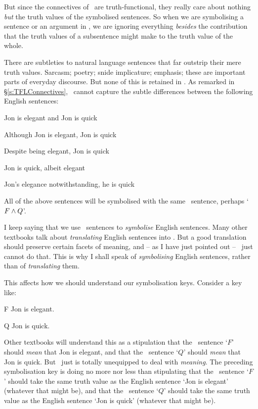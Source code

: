 But since the connectives of \TFL\ are truth-functional, they really care about nothing \emph{but} the truth values of the symbolised sentences. So when we are symbolising a sentence or an argument in \TFL, we  are ignoring everything \emph{besides} the contribution that the truth values of a subsentence might make to the truth value of the whole. 

There are subtleties to natural language sentences that far outstrip their mere truth values. Sarcasm; poetry; snide implicature; emphasis; these are important parts of everyday discourse. But none of this is retained in \TFL. As remarked in §\ref{s:TFLConnectives}, \TFL\ cannot capture the subtle differences between the following English sentences:
	\begin{earg}
		\item Jon is elegant and Jon is quick
		\item Although Jon is elegant, Jon is quick
		\item Despite being elegant, Jon is quick
		\item Jon is quick, albeit elegant
		\item Jon's elegance notwithstanding, he is quick
	\end{earg}
All of the above sentences will be symbolised with the same \TFL\ sentence, perhaps `$F \wedge Q$'.

I keep saying that we use \TFL\ sentences to \emph{symbolise} English sentences. Many other textbooks talk about \emph{translating} English sentences into \TFL. But a good translation should preserve certain facets of meaning, and – as I have just pointed out – \TFL\ just cannot do that. This is why I shall speak of \emph{symbolising} English sentences, rather than of \emph{translating} them.

This affects how we should understand our symbolisation keys. Consider a key like:
	\begin{ekey}
		\item[F] Jon is elegant.
		\item[Q] Jon is quick.
	\end{ekey}
Other textbooks will understand this as a stipulation that the \TFL\ sentence `$F$' should \emph{mean} that Jon is elegant, and that the \TFL\ sentence `$Q$' should \emph{mean} that Jon is quick. But \TFL\ just is totally unequipped to deal with \emph{meaning}. The preceding symbolisation key is doing no more nor less than stipulating that the \TFL\ sentence `$F$' should take the same truth value as the English sentence `Jon is elegant' (whatever that might be), and that the \TFL\ sentence `$Q$' should take the same truth value as the English sentence `Jon is quick' (whatever that might be). 

